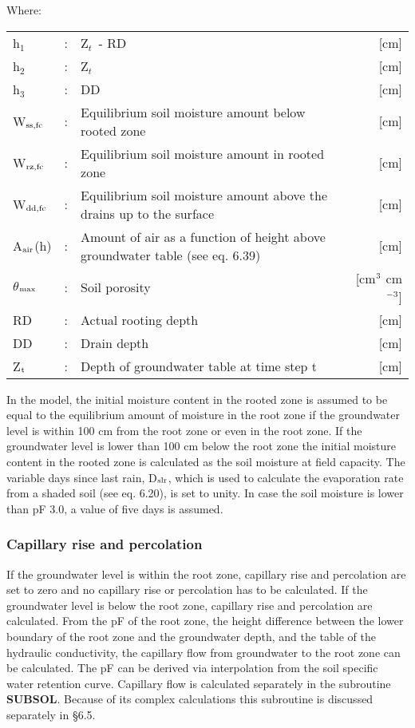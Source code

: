 Where:\\[5pt]
\begin{tabularx}{\textwidth}{llXr}
h$_{1}$ &:& Z$_{t~}$ - RD & [cm]\\
h$_{2}$ &:& Z$_{t}$  & [cm]\\
h$_{3}$ &:& DD  & [cm]\\

W$_{{\rm ss,fc}}$ &:& Equilibrium soil moisture amount below rooted zone  & [cm]\\
W$_{{\rm rz,fc}}$ &:& Equilibrium soil moisture amount in rooted zone  & [cm]\\
W$_{{\rm dd,fc}}$ &:& Equilibrium soil moisture amount above the drains up 
   to the surface  & [cm]\\
A$_{{\rm air}}$(h) &:& Amount of air as a function of height above groundwater
   table (see eq. 6.39)  & [cm]\\
$\theta$$_{{\rm max}}$ &:& Soil porosity  & [cm$^{{\rm 3}}$ cm$^{{\rm -3}}$]\\
RD &:& Actual rooting depth  & [cm]\\
DD &:& Drain depth  & [cm]\\
Z$_{{\rm t}}$ &:& Depth of groundwater table at time step t  & [cm]\\
\end{tabularx}

In the model, the initial moisture content in the rooted zone is assumed to be equal to the
equilibrium amount of moisture in the root zone if the groundwater level is within 100 cm
from the root zone or even in the root zone. If the groundwater level is lower than 100
cm below the root zone the initial moisture content in the rooted zone is calculated as the
soil moisture at field capacity. The variable days since last rain, D$_{{\rm slr}}$, which is used to
calculate the evaporation rate from a shaded soil (see eq. 6.20), is set to unity. In case the
soil moisture is lower than pF 3.0, a value of five days is assumed.

\subsubsection{Capillary rise and percolation}
If the groundwater level is within the root zone, capillary rise and percolation are set to
zero and no capillary rise or percolation has to be calculated. 
If the groundwater level is below the root zone, capillary rise and percolation are
calculated. From the pF of the root zone, the height difference between the lower
boundary of the root zone and the groundwater depth, and the table of the hydraulic
conductivity, the capillary flow from groundwater to the root zone can be calculated. The
pF can be derived via interpolation from the soil specific water retention curve. Capillary
flow is calculated separately in the subroutine {\bf SUBSOL}. Because of its complex 
calculations this subroutine is discussed separately in \S 6.5. 

